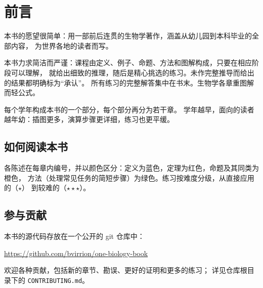 \chapter{前言}

本书的愿望很简单：用一部前后连贯的生物学著作，涵盖从幼儿园到本科毕业的全部内容，
为世界各地的读者而写。

本书力求简洁而严谨：课程由定义、例子、命题、方法和图解构成，只要在相应阶段可以理解，
就给出细致的推理，随后是精心挑选的练习。未作完整推导而给出的结果都明确标为“承认”。
所有练习的完整解答集中在书末。生物学各章重图解而轻公式。

每个学年构成本书的一个部分，每个部分再分为若干章。
学年越早，面向的读者越年幼：插图更多，演算步骤更详细，练习也更平缓。

\section*{如何阅读本书}

各陈述在每章内编号，并以颜色区分：定义为蓝色，定理为红色，命题及其同类为橙色，
方法（处理常见任务的简短步骤）为绿色。练习按难度分级，从直接应用的（$\star$）
到较难的（$\star\star\star$）。

\section*{参与贡献}

本书的源代码存放在一个公开的 git 仓库中：
\begin{center}
\url{https://github.com/bvirrion/one-biology-book}
\end{center}
欢迎各种贡献，包括新的章节、勘误、更好的证明和更多的练习；
详见仓库根目录下的 \texttt{CONTRIBUTING.md}。
